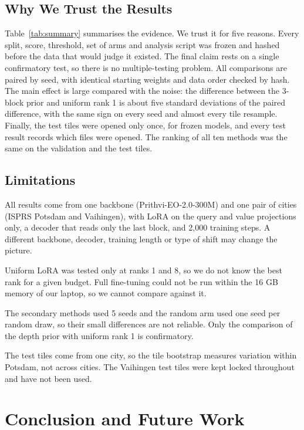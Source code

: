 \documentclass[11pt,a4paper]{report}
\begin{document}
\section{Why We Trust the Results}

Table~\ref{tab:summary} summarises the evidence. We trust it for five reasons. Every split, score, threshold, set of arms and analysis script was frozen and hashed before the data that would judge it existed. The final claim rests on a single confirmatory test, so there is no multiple-testing problem. All comparisons are paired by seed, with identical starting weights and data order checked by hash. The main effect is large compared with the noise: the difference between the 3-block prior and uniform rank 1 is about five standard deviations of the paired difference, with the same sign on every seed and almost every tile resample. Finally, the test tiles were opened only once, for frozen models, and every test result records which files were opened. The ranking of all ten methods was the same on the validation and the test tiles.

\section{Limitations}

All results come from one backbone (Prithvi-EO-2.0-300M) and one pair of cities (ISPRS Potsdam and Vaihingen), with LoRA on the query and value projections only, a decoder that reads only the last block, and 2,000 training steps. A different backbone, decoder, training length or type of shift may change the picture.

Uniform LoRA was tested only at ranks 1 and 8, so we do not know the best rank for a given budget. Full fine-tuning could not be run within the 16 GB memory of our laptop, so we cannot compare against it.

The secondary methods used 5 seeds and the random arm used one seed per random draw, so their small differences are not reliable. Only the comparison of the depth prior with uniform rank 1 is confirmatory.

The test tiles come from one city, so the tile bootstrap measures variation within Potsdam, not across cities. The Vaihingen test tiles were kept locked throughout and have not been used.

\chapter{Conclusion and Future Work}
\label{ch:conclusion}
\end{document}
